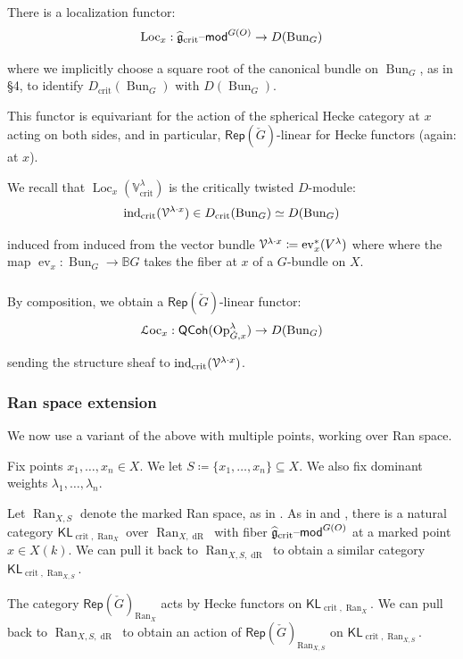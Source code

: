 \documentclass[reqno,11pt]{amsart}
\numberwithin{equation}{subsection}
\theoremstyle{remark}
\newcommand{\Loc}{\on{Loc}}
\newcommand{\bB}{{\mathbb B}}
\newcommand{\bV}{{\mathbb V}}
\newcommand{\sV}{{\EuScript V}}
\newcommand{\fg}{{\mathfrak g}}
\newcommand{\on}{\operatorname}
\newcommand{\mathendash}{\text{\textendash}}
\newcommand{\ev}{\on{ev}}
\newcommand{\ind}{\on{ind}}
\newcommand{\Rep}{\mathsf{Rep}}
\newcommand{\Bun}{\on{Bun}}
\newcommand{\Op}{\on{Op}}
\renewcommand{\mod}{\mathendash\mathsf{mod}}
\newcommand{\QCoh}{\mathsf{QCoh}}
\renewcommand{\subset}{\subseteq}
\newcommand{\Ran}{\on{Ran}}
\newcommand{\crit}{\on{crit}}
\newcommand{\KL}{\mathsf{KL}}
\newcommand{\dR}{\on{dR}}
\begin{document}
There is a localization functor:
%
\[
\Loc_x:\widehat{\fg}_{\crit}\mod^{G(O)} \to D(\Bun_G)
\]

\noindent where we implicitly choose a square root of the canonical
bundle on $\Bun_G$, as in \cite{hitchin} \S 4, to identify $D_{\crit}(\Bun_G)$
with $D(\Bun_G)$.

This functor is equivariant for the action of the spherical Hecke category
at $x$ acting on both
sides, and in particular, $\Rep(\check{G})$-linear for Hecke functors (again: at $x$).

We recall that $\Loc_x(\bV_{\crit}^{\lambda})$ is the critically twisted 
$D$-module:
%
\[
\ind_{\crit}(\sV^{\lambda\cdot x}) \in D_{\crit}(\Bun_G) \simeq D(\Bun_G)
\] 

\noindent induced from induced from the vector bundle $\sV^{\lambda\cdot x}
\coloneqq \ev_x^*(V^{\lambda})$ where
where the map  $\ev_x:\Bun_G \to \bB G$ takes the fiber at $x$ of a $G$-bundle on $X$.

\subsubsection{}

By composition, we obtain a $\Rep(\check{G})$-linear functor:
%
\[
\EuScript{L}\text{oc}_x:\QCoh(\Op_{\check{G},x}^{\lambda}) \to D(\Bun_G)
\]

\noindent sending the structure sheaf to $\ind_{\crit}(\sV^{\lambda\cdot x})$.

\subsubsection{Ran space extension}

We now use a variant of the above with multiple points, working over Ran space.

Fix points $x_1,\ldots,x_n \in X$. We let $S \coloneqq \{x_1,\ldots,x_n\} \subset X$.
We also fix dominant weights $\lambda_1,\ldots,\lambda_n$.

Let $\Ran_{X,S}$ denote the marked Ran space, as in \cite{contractibility}. 
As in \cite{jerusalem2014} and \cite{charles-lin}, 
there is a natural category $\KL_{\crit,\Ran_X}$ over $\Ran_{X,\dR}$ with fiber 
$\widehat{\fg}_{\crit}\mod^{G(O)}$ at a marked point $x \in X(k)$.
We can pull it back to $\Ran_{X,S,\dR}$ to obtain a similar category
$\KL_{\crit,\Ran_{X,S}}$. 

The category $\Rep(\check{G})_{\Ran_X}$ acts by Hecke functors on 
$\KL_{\crit,\Ran_X}$. We can pull back to $\Ran_{X,S,\dR}$ to obtain 
an action of $\Rep(\check{G})_{\Ran_{X,S}}$ on $\KL_{\crit,\Ran_{X,S}}$.
\end{document}
